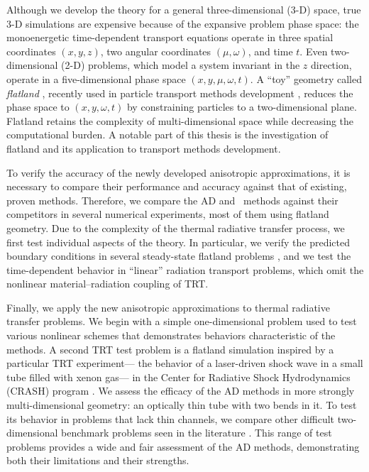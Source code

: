 Although we develop the theory for a general three-dimensional (3-D) space,
true \mbox{3-D} simulations are expensive because of the expansive problem phase
space: the monoenergetic time-dependent transport equations operate in three
spatial coordinates $(x,y,z)$,
two angular coordinates $(\mu,\omega)$, and time $t$.
Even two-dimensional (2-D)
problems, which model a system invariant in the $z$ direction, operate in  a
five-dimensional phase space $(x,y,\mu,\omega,t)$. A ``toy'' geometry called
\emph{flatland}
\cite{Abb1884}, recently used in particle transport methods development
\cite{Asa2008,Lar2009c},
reduces the phase space to $(x,y,\omega,t)$ by constraining particles to a
two-dimensional plane. Flatland retains the complexity of multi-dimensional
space while decreasing the computational burden. A notable part of this thesis
is the investigation of flatland and its application to transport methods
development.

To verify the accuracy of the newly developed anisotropic approximations, it is
necessary to
compare their performance and accuracy against that of existing, proven methods.
Therefore, we compare the AD and \APone\ methods against their competitors in several numerical
experiments, most of them using flatland geometry. Due to the complexity of
the thermal radiative transfer process, we first test individual aspects of the
theory. In particular, we verify the predicted boundary conditions in several
steady-state flatland problems \cite{Joh2011a}, and we test the time-dependent
behavior in ``linear'' radiation transport problems, which omit the nonlinear
material--radiation coupling of TRT.

Finally, we apply the new anisotropic approximations to thermal radiative
transfer problems. We begin with a simple one-dimensional problem used to test
various nonlinear schemes \cite{Rau2005} that demonstrates behaviors
characteristic of the methods. A second TRT test problem is a flatland simulation
\cite{Joh2011} inspired by a particular TRT experiment---%
the behavior of a laser-driven shock wave in a small tube filled with xenon
gas---%
in the Center for Radiative Shock Hydrodynamics (CRASH) program
\cite{Crash2010}.
We assess the efficacy of the AD methods in more strongly multi-dimensional
geometry: an optically thin tube with two bends in it.
To test its behavior in problems that lack thin channels, we compare other
difficult two-dimensional benchmark problems seen in the literature
\cite{Mou2006}.
This range of test problems provides a wide and
fair assessment of the AD methods, demonstrating both their limitations and
their strengths.

